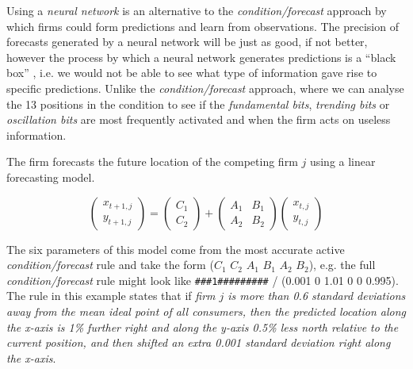 \documentclass[preprint, 12pt]{elsarticle}
\begin{document}
Using a \emph{neural network} is an alternative to the \emph{condition/forecast} approach by which firms could form predictions and learn from observations. The precision of forecasts generated by a neural network will be just as good, if not better, however the process by which a neural network generates predictions is a ``black box'' \citep[chapter~3]{Arthur_2014}, i.e. we would not be able to see what type of information gave rise to specific predictions. Unlike the \emph{condition/forecast} approach, where we can analyse the 13 positions in the condition to see if the \emph{fundamental bits}, \emph{trending bits} or \emph{oscillation bits} are most frequently activated and when the firm acts on useless information. 

The firm forecasts the future location of the competing firm $j$ using a linear forecasting model. 

$$\left( \begin{array}{*{20}{c}} {{x_{t + 1,j}}}\\ {{y_{t + 1,j}}} \end{array} \right) = \left( {\begin{array}{*{20}{c}} {{C_1}}\\ {{C_2}} \end{array}} \right) + \left( {\begin{array}{*{20}{c}} {{A_1}}&{{B_1}}\\ {{A_2}}&{{B_2}} \end{array}} \right)\left( {\begin{array}{*{20}{c}} {{x_{t,j}}}\\ {{y_{t,j}}} \end{array}} \right)$$

The six parameters of this model come from the most accurate active \emph{condition/forecast} rule and take the form ($C_1$ $C_2$ $A_1$ $B_1$ $A_2$ $B_2$), e.g. the full \emph{condition/forecast} rule might look like \texttt{\#\#\#1\#\#\#\#\#\#\#\#\#} / (0.001 0 1.01 0 0 0.995). The rule in this example states that if \emph{firm $j$ is more than 0.6 standard deviations away from the mean ideal point of all consumers, then the predicted location along the x-axis is 1\% further right and along the y-axis 0.5\% less north relative to the current position, and then shifted an extra 0.001 standard deviation right along the x-axis}.
\end{document}
